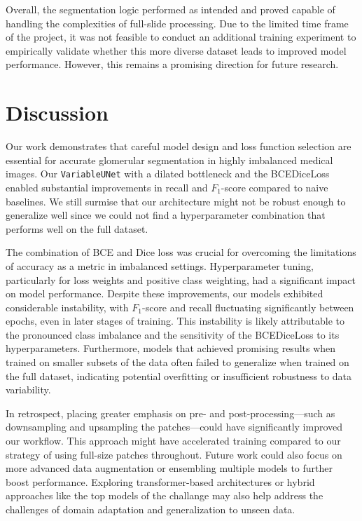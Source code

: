 \documentclass[12pt]{article}
\begin{document}
Overall, the segmentation logic performed as intended and proved capable of handling the complexities of full-slide processing. Due to the limited time frame of the project, it was not feasible to conduct an additional training experiment to empirically validate whether this more diverse dataset leads to improved model performance. However, this remains a promising direction for future research.

\section{Discussion}

Our work demonstrates that careful model design and loss function selection are essential for accurate glomerular segmentation in highly imbalanced medical images. Our \texttt{VariableUNet} with a dilated bottleneck and the BCEDiceLoss enabled substantial improvements in recall and $F_1$-score compared to naive baselines. We still surmise that our architecture might not be robust enough to generalize well since we could not find a hyperparameter combination that performs well on the full dataset.

The combination of BCE and Dice loss was crucial for overcoming the limitations of accuracy as a metric in imbalanced settings. Hyperparameter tuning, particularly for loss weights and positive class weighting, had a significant impact on model performance. Despite these improvements, our models exhibited considerable instability, with $F_1$-score and recall fluctuating significantly between epochs, even in later stages of training. This instability is likely attributable to the pronounced class imbalance and the sensitivity of the BCEDiceLoss to its hyperparameters. Furthermore, models that achieved promising results when trained on smaller subsets of the data often failed to generalize when trained on the full dataset, indicating potential overfitting or insufficient robustness to data variability.

In retrospect, placing greater emphasis on pre- and post-processing—such as downsampling and upsampling the patches—could have significantly improved our workflow. This approach might have accelerated training compared to our strategy of using full-size patches throughout. Future work could also focus on more advanced data augmentation or ensembling multiple models to further boost performance. Exploring transformer-based architectures or hybrid approaches like the top models of the challange may also help address the challenges of domain adaptation and generalization to unseen data.
\end{document}
